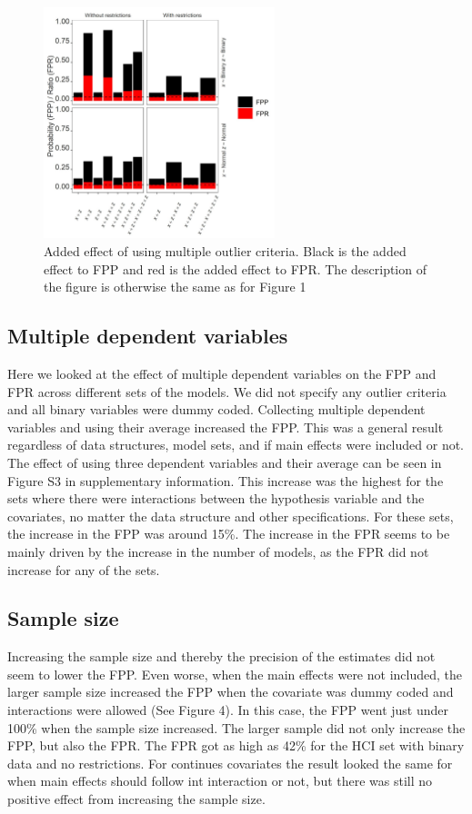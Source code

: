 \begin{figure}[t]
\includegraphics[width=0.6\textwidth]{R/Analysis/Result/Figures/Figure1B.jpeg}
\centering
\caption{Added effect of using multiple outlier criteria. Black is the added effect to FPP and red is the added effect to FPR.  The description of the figure is otherwise the same as for Figure 1}
\label{fig:mainfigure}
\end{figure}

\subsection{Multiple dependent variables}
Here we looked at the effect of multiple dependent variables on the FPP and FPR across different sets of the models. We did not specify any outlier criteria and all binary variables were dummy coded. Collecting multiple dependent variables and using their average increased the FPP. This was a general result regardless of data structures, model sets, and if main effects were included or not. The effect of using three dependent variables and their average can be seen in Figure S3 in supplementary information. This increase was the highest for the sets where there were interactions between the hypothesis variable and the covariates, no matter the data structure and other specifications. For these sets, the increase in the FPP was around 15\%. The increase in the FPR seems to be mainly driven by the increase in the number of models, as the FPR did not increase for any of the sets. 

\subsection{Sample size}
Increasing the sample size and thereby the precision of the estimates did not seem to lower the FPP. Even worse, when the main effects were not included, the larger sample size increased the FPP when the covariate was dummy coded and interactions were allowed (See Figure 4). In this case, the FPP went just under 100\% when the sample size increased. The larger sample did not only increase the FPP, but also the FPR. The FPR got as high as 42\% for the HCI set with binary data and no restrictions. For continues covariates the result looked the same for when main effects should follow int interaction or not, but there was still no positive effect from increasing the sample size. 


